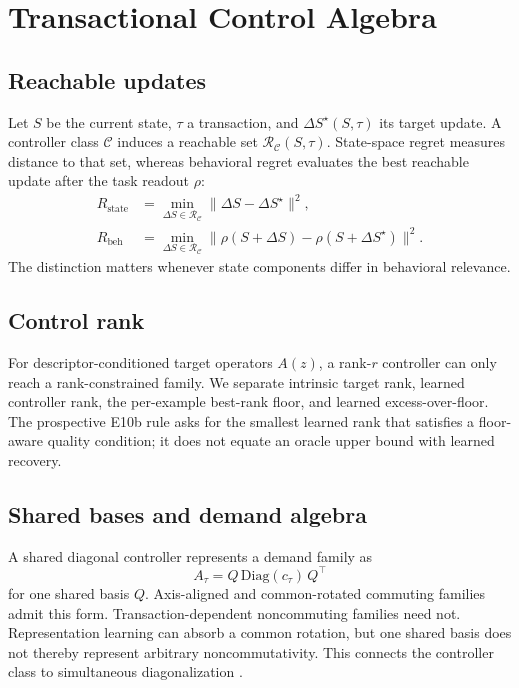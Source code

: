 \section{Transactional Control Algebra}
\label{sec:algebra}

\subsection{Reachable updates}

Let $S$ be the current state, $\tau$ a transaction, and
$\Delta S^\star(S,\tau)$ its target update.  A controller class
$\mathcal{C}$ induces a reachable set
$\mathcal{R}_{\mathcal{C}}(S,\tau)$.  State-space regret measures distance to
that set, whereas behavioral regret evaluates the best reachable update after
the task readout $\rho$:
\begin{align}
R_{\mathrm{state}}
  &= \min_{\Delta S\in\mathcal{R}_{\mathcal{C}}}
     \lVert\Delta S-\Delta S^\star\rVert^2,\\
R_{\mathrm{beh}}
  &= \min_{\Delta S\in\mathcal{R}_{\mathcal{C}}}
     \lVert\rho(S+\Delta S)-\rho(S+\Delta S^\star)\rVert^2.
\end{align}
The distinction matters whenever state components differ in behavioral
relevance.

\subsection{Control rank}

For descriptor-conditioned target operators $A(z)$, a rank-$r$ controller can
only reach a rank-constrained family.  We separate intrinsic target rank,
learned controller rank, the per-example best-rank floor, and learned
excess-over-floor.  The prospective E10b rule asks for the smallest learned
rank that satisfies a floor-aware quality condition; it does not equate an
oracle upper bound with learned recovery.

\subsection{Shared bases and demand algebra}

A shared diagonal controller represents a demand family as
\begin{equation}
  A_\tau = Q\,\mathrm{Diag}(c_\tau)\,Q^\top
\end{equation}
for one shared basis $Q$.  Axis-aligned and common-rotated commuting families
admit this form.  Transaction-dependent noncommuting families need not.
Representation learning can absorb a common rotation, but one shared basis
does not thereby represent arbitrary noncommutativity.  This connects the
controller class to simultaneous diagonalization
\citep{bunsegerstner1993simultaneous,cardoso1996jacobi,glashoff2013almost}.

